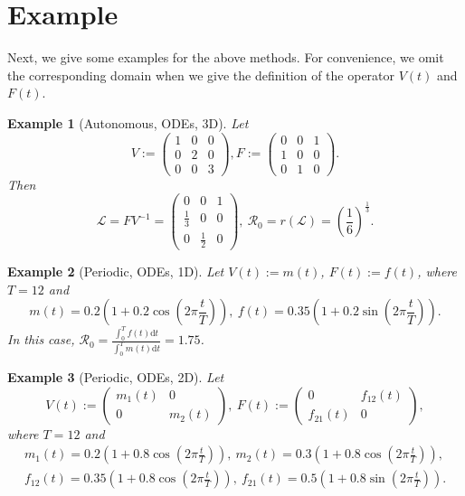 \documentclass[12pt,reqno]{article}
\newtheorem{example}{Example}
\newcommand{\D}{\mathrm{d}}
\newcommand{\cL}{\mathcal{L}}
\newcommand{\R}{\mathcal{R}_0}
\begin{document}
\section{Example}\label{sec:example}
Next, we give some examples for the above methods. For convenience, we omit the corresponding domain when we give the definition of the operator $V(t)$ and $F(t)$.
\begin{example}[Autonomous, ODEs, 3D]
	Let
	$$
	V:=
	\left(
	\begin{matrix}
	1& 0& 0\\
	0& 2& 0\\
	0& 0& 3
	\end{matrix}
	\right),
	F:=
	\left(
	\begin{matrix}
	0& 0& 1\\
	1& 0& 0\\
	0& 1& 0
	\end{matrix}
	\right).
	$$
	 Then
	 $$
	 \cL=FV^{-1}=
	 \left(
	 \begin{matrix}
	 0& 0& 1\\
	 \frac{1}{3}& 0& 0\\
	 0& \frac{1}{2}& 0
	 \end{matrix}
	 \right),~
	 \R=r(\cL)= (\frac{1}{6})^{\frac{1}{3}}.
	 $$
\end{example}

\begin{example}[Periodic, ODEs, 1D] Let $V(t):=m(t)$, $F(t):=f(t)$, where $T=12$ and
	$$m(t)=0.2(1+0.2\cos(2\pi \frac{t}{T})), ~f(t)=0.35(1+0.2\sin(2\pi \frac{t}{T})).$$
	In this case, $\R = \frac{\int_{0}^{T} f(t) \D t}{\int_{0}^{T} m(t) \D t}=1.75$.
\end{example}

\begin{example}[Periodic, ODEs, 2D] Let
	$$V(t):=
	\left(
	\begin{matrix}
	m_1 (t) & 0\\
	0& m_2(t)
	\end{matrix}
	\right), ~
	F(t):=
	\left(
	\begin{matrix}
	0 & f_{12} (t)\\
	f_{21} (t)& 0
	\end{matrix}
	\right),
	$$ where $T=12$ and
	$$
\begin{aligned}
m_1(t)= 0.2(1+0.8\cos(2\pi \frac{t}{T})),~
m_2(t)= 0.3(1+0.8\cos(2\pi \frac{t}{T})),\\
f_{12}(t)=0.35(1+0.8\cos(2\pi \frac{t}{T})),~
f_{21}(t)=0.5(1+0.8\sin(2\pi \frac{t}{T})).
\end{aligned}
$$
\end{example}
\end{document}
